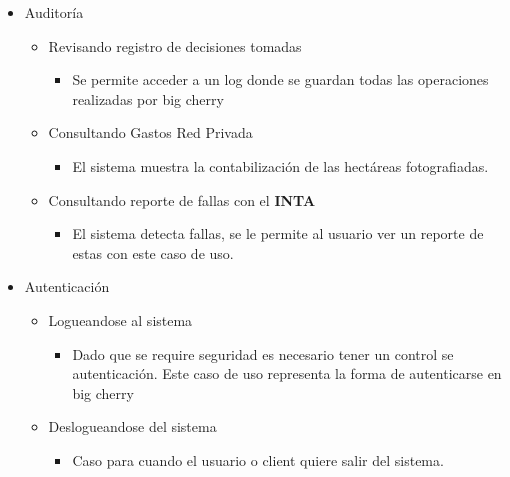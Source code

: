 \begin{itemize}
 \item Auditor\'ia
 \begin{itemize}
    \item Revisando registro de decisiones tomadas
    \begin{itemize}
	\item Se permite acceder a un log donde se guardan todas las operaciones realizadas por big cherry
    \end{itemize}
    \item Consultando Gastos Red Privada
    \begin{itemize}
     \item El sistema muestra la contabilizaci\'on de las hect\'areas fotografiadas.
    \end{itemize}
    \item Consultando reporte de fallas con el \textbf{INTA}
    \begin{itemize}
     \item El sistema detecta fallas, se le permite al usuario ver un reporte de estas con este caso de uso.
    \end{itemize}

 \end{itemize}
 \item Autenticaci\'on
 \begin{itemize}
    \item Logueandose al sistema
    \begin{itemize}
      \item Dado que se require seguridad es necesario tener un control se autenticaci\'on. Este caso de uso representa la forma de autenticarse en big cherry
    \end{itemize}
    \item Deslogueandose del sistema
    \begin{itemize}
      \item Caso para cuando el usuario o client quiere salir del sistema.
    \end{itemize}
 \end{itemize}
\end{itemize}
